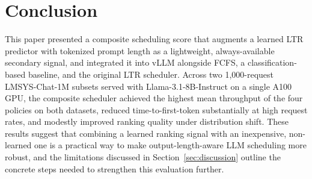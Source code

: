 \section{Conclusion}
\label{sec:conclusion}

This paper presented a composite scheduling score that augments a learned
LTR predictor with tokenized prompt length as a lightweight, always-available
secondary signal, and integrated it into vLLM alongside FCFS, a
classification-based baseline, and the original LTR scheduler. Across two
1{,}000-request LMSYS-Chat-1M subsets served with Llama-3.1-8B-Instruct on a
single A100 GPU, the composite scheduler achieved the highest mean throughput
of the four policies on both datasets, reduced time-to-first-token
substantially at high request rates, and modestly improved ranking quality
under distribution shift. These results suggest that combining a learned
ranking signal with an inexpensive, non-learned one is a practical way to make
output-length-aware LLM scheduling more robust, and the limitations discussed
in Section~\ref{sec:discussion} outline the concrete steps needed to
strengthen this evaluation further.
